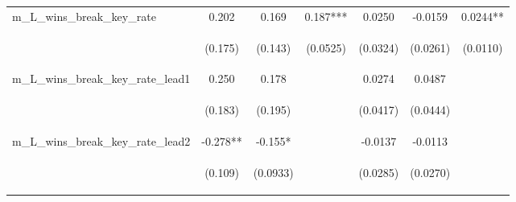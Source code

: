 \begin{tabular}{lcccccc}
m\_L\_wins\_break\_key\_rate & 0.202 & 0.169 & 0.187*** & 0.0250 & -0.0159 & 0.0244** \\
\vspace{4pt} & \begin{footnotesize}(0.175)\end{footnotesize} & \begin{footnotesize}(0.143)\end{footnotesize} & \begin{footnotesize}(0.0525)\end{footnotesize} & \begin{footnotesize}(0.0324)\end{footnotesize} & \begin{footnotesize}(0.0261)\end{footnotesize} & \begin{footnotesize}(0.0110)\end{footnotesize} \\
m\_L\_wins\_break\_key\_rate\_lead1 & 0.250 & 0.178 &  & 0.0274 & 0.0487 &  \\
\vspace{4pt} & \begin{footnotesize}(0.183)\end{footnotesize} & \begin{footnotesize}(0.195)\end{footnotesize} & \begin{footnotesize}\end{footnotesize} & \begin{footnotesize}(0.0417)\end{footnotesize} & \begin{footnotesize}(0.0444)\end{footnotesize} & \begin{footnotesize}\end{footnotesize} \\
m\_L\_wins\_break\_key\_rate\_lead2 & -0.278** & -0.155* &  & -0.0137 & -0.0113 &  \\
\vspace{4pt} & \begin{footnotesize}(0.109)\end{footnotesize} & \begin{footnotesize}(0.0933)\end{footnotesize} & \begin{footnotesize}\end{footnotesize} & \begin{footnotesize}(0.0285)\end{footnotesize} & \begin{footnotesize}(0.0270)\end{footnotesize} & \begin{footnotesize}\end{footnotesize} \\

\end{tabular}
